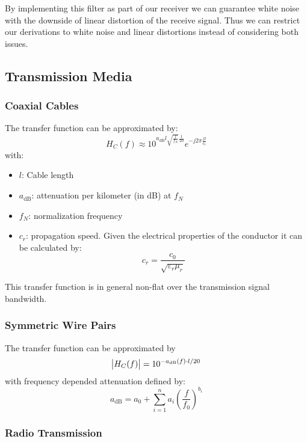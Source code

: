 By implementing this filter as part of our receiver we can guarantee white noise with
the downside of linear distortion of the receive signal. 
Thus we can restrict our derivations to white noise and linear distortions instead of considering both issues.

\subsection{Transmission Media}
\subsubsection{Coaxial Cables}
The transfer function can be approximated by:
\begin{equation}
    H_C(f) \approx 10^{a_\text{dB} l \sqrt{\frac{f}{f_N}} \frac{1}{20}} e^{-j 2\pi \frac{f l}{c_r}}
\end{equation}
with:
\begin{itemize}
    \item $l$: Cable length
    \item $a_\text{dB}$: attenuation per kilometer (in dB) at $f_N$
    \item $f_N$: normalization frequency
    \item $c_r$: propagation speed. Given the electrical properties of the conductor
        it can be calculated by:
        \begin{equation}
            c_r = \frac{c_0}{\sqrt{\varepsilon_r \mu_r}}
        \end{equation}
\end{itemize}

This transfer function is in general non-flat over the transmission signal bandwidth.

\subsubsection{Symmetric Wire Pairs}
The transfer function can be approximated by
\begin{equation}
    \abs{H_C(f)} = 10^{-a_\text{dB}(f) \cdot l / 20}
\end{equation}
with frequency depended attenuation defined by:
\begin{equation}
    a_\text{dB} = a_0 + \sum_{i=1}^n a_i {\left(\frac{f}{f_0}\right)}^{b_i}
\end{equation} 

\subsubsection{Radio Transmission}
